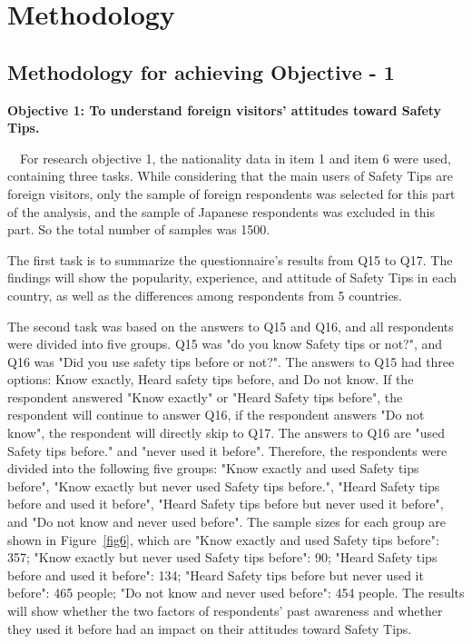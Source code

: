 


\chapter{Methodology }

\section{Methodology for achieving Objective - 1 }

\textbf{Objective 1: To understand foreign visitors' attitudes toward Safety Tips.}

　For research objective 1, the nationality data in item 1 and item 6 were used, containing three tasks. While considering that the main users of Safety Tips are foreign visitors, only the sample of foreign respondents was selected for this part of the analysis, and the sample of Japanese respondents was excluded in this part. So the total number of samples was 1500.

The first task is to summarize the questionnaire's results from Q15 to Q17. The findings will show the popularity, experience, and attitude of Safety Tips in each country, as well as the differences among respondents from 5 countries.

The second task was based on the answers to Q15 and Q16, and all respondents were divided into five groups. Q15 was "do you know Safety tips or not?", and Q16 was "Did you use safety tips before or not?". The answers to Q15 had three options: Know exactly, Heard safety tips before, and Do not know. If the respondent answered "Know exactly" or "Heard Safety tips before", the respondent will continue to answer Q16, if the respondent answers "Do not know", the respondent will directly skip to Q17. The answers to Q16 are "used Safety tips before." and "never used it before". Therefore, the respondents were divided into the following five groups: "Know exactly and used Safety tips before", "Know exactly but never used Safety tips before.", "Heard Safety tips before and used it before", "Heard Safety tips before but never used it before", and "Do not know and never used before". The sample sizes for each group are shown in Figure~\ref{fig6}, which are "Know exactly and used Safety tips before": 357; "Know exactly but never used Safety tips before": 90; "Heard Safety tips before and used it before": 134; "Heard Safety tips before but never used it before": 465 people; "Do not know and never used before": 454 people. The results will show whether the two factors of respondents' past awareness and whether they used it before had an impact on their attitudes toward Safety Tips.

